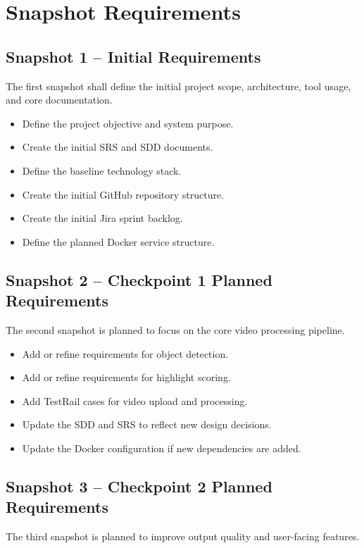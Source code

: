 \documentclass[12pt]{article}
\begin{document}
\newpage

\section{Snapshot Requirements}

\subsection{Snapshot 1 -- Initial Requirements}
The first snapshot shall define the initial project scope, architecture, tool usage, and core documentation.

\begin{itemize}[noitemsep]
    \item Define the project objective and system purpose.
    \item Create the initial SRS and SDD documents.
    \item Define the baseline technology stack.
    \item Create the initial GitHub repository structure.
    \item Create the initial Jira sprint backlog.
    \item Define the planned Docker service structure.
\end{itemize}

\subsection{Snapshot 2 -- Checkpoint 1 Planned Requirements}
The second snapshot is planned to focus on the core video processing pipeline.

\begin{itemize}[noitemsep]
    \item Add or refine requirements for object detection.
    \item Add or refine requirements for highlight scoring.
    \item Add TestRail cases for video upload and processing.
    \item Update the SDD and SRS to reflect new design decisions.
    \item Update the Docker configuration if new dependencies are added.
\end{itemize}

\subsection{Snapshot 3 -- Checkpoint 2 Planned Requirements}
The third snapshot is planned to improve output quality and user-facing features.
\end{document}
